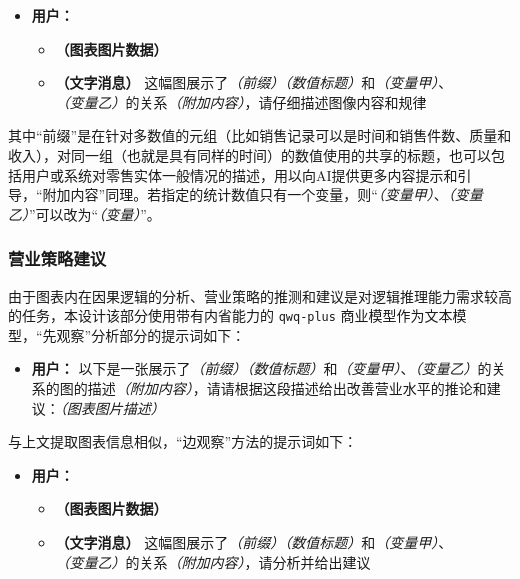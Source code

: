 \begin{itemize}
    \item[] \textbf{用户：}
    \begin{itemize}
        \item[] \textbf{（图表图片数据）}
        \item[] \textbf{（文字消息）} 这幅图展示了\textit{（前缀）}\textit{（数值标题）}和\textit{（变量甲）}、\textit{（变量乙）}的关系\textit{（附加内容）}，请仔细描述图像内容和规律
    \end{itemize}
\end{itemize}

其中“前缀”是在针对多数值的元组（比如销售记录可以是时间和销售件数、质量和收入），对同一组（也就是具有同样的时间）的数值使用的共享的标题，也可以包括用户或系统对零售实体一般情况的描述，用以向AI提供更多内容提示和引导，“附加内容”同理。若指定的统计数值只有一个变量，则“\textit{（变量甲）}、\textit{（变量乙）}”可以改为“\textit{（变量）}”。

\subsubsection{营业策略建议}

由于图表内在因果逻辑的分析、营业策略的推测和建议是对逻辑推理能力需求较高的任务，本设计该部分使用带有内省能力的 \verb|qwq-plus| 商业模型作为文本模型，“先观察”分析部分的提示词如下：

\begin{itemize}
    \item[] \textbf{用户：} 以下是一张展示了\textit{（前缀）}\textit{（数值标题）}和\textit{（变量甲）}、\textit{（变量乙）}的关系的图的描述\textit{（附加内容）}，请请根据这段描述给出改善营业水平的推论和建议：\textit{（图表图片描述）}
\end{itemize}

与上文提取图表信息相似，“边观察”方法的提示词如下：

\begin{itemize}
    \item[] \textbf{用户：}
    \begin{itemize}
        \item[] \textbf{（图表图片数据）}
        \item[] \textbf{（文字消息）} 这幅图展示了\textit{（前缀）}\textit{（数值标题）}和\textit{（变量甲）}、\textit{（变量乙）}的关系\textit{（附加内容）}，请分析并给出建议
    \end{itemize}
\end{itemize}

